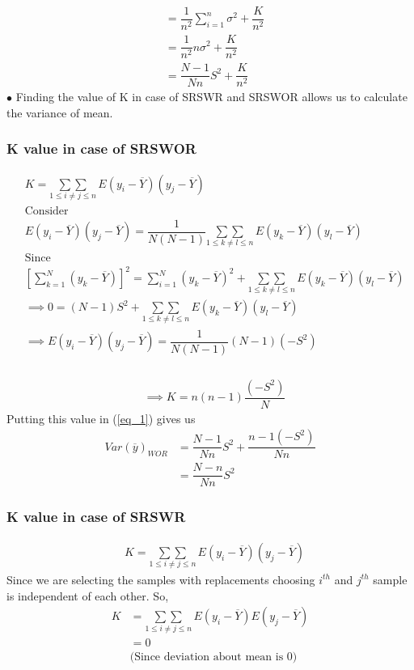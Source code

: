 \documentclass{beamer}
\begin{document}
\begin{frame}
\frametitle{}
\begin{align}
& = \dfrac{1}{n^2}\sum_{i=1}^{n} \sigma^2 + \dfrac{K}{n^2}\\
& = \dfrac{1}{n^2} n \sigma^2 +\dfrac{K}{n^2} \\
&= \dfrac{N-1}{Nn} S^2+\dfrac{K}{n^2}\label{eq_1}
\end{align}
$\bullet$ Finding the value of K in case of SRSWR and SRSWOR allows us to calculate the variance of mean.
\end{frame}

\begin{frame}
\frametitle{K value in case of SRSWOR}
\begin{align*}
&K=\underset{1\leq i\neq j\leq n}{\sum\sum}\, E(y_i-\overline{Y})(y_j-\overline{Y})\\
&\text{Consider}\\
&E(y_i-\overline{Y})(y_j-\overline{Y})=\dfrac{1}{N(N-1)}\underset{1\leq k\neq l\leq n}{\sum\sum}\, E(y_k-\overline{Y})(y_l-\overline{Y})\\
&\text{Since}\\
&\left[\sum_{k=1}^N(y_k-\overline{Y})\right]^2=\sum_{i=1}^{N}(y_k-\overline{Y})^2+
\underset{1\leq k\neq l\leq n}{\sum\sum}\, E(y_k-\overline{Y})(y_l-\overline{Y})\\
&\implies 0 = (N-1)S^2+\underset{1\leq k\neq l\leq n}{\sum\sum}\, E(y_k-\overline{Y})(y_l-\overline{Y})\\
& \implies E(y_i-\overline{Y})(y_j-\overline{Y})=\dfrac{1}{N(N-1)}(N-1)(-S^2)
\end{align*}
\end{frame}

\begin{frame}
\frametitle{}
\begin{align*}
& \implies K = n(n-1)\dfrac{(-S^2)}{N}
\end{align*}
Putting this value in (\ref{eq_1}) gives us 
\begin{align}
Var(\overline{y})_{WOR} & = \dfrac{N-1}{Nn} S^2+ \dfrac{n-1(-S^2)}{Nn}\\
& = \dfrac{N-n}{Nn} S^2 \label{eq_2}
\end{align}

\end{frame}

\begin{frame}
\frametitle{K value in case of SRSWR}
\begin{align*}
&K=\underset{1\leq i\neq j\leq n}{\sum\sum}\, E(y_i-\overline{Y})(y_j-\overline{Y})
\end{align*}
Since we are selecting the samples with replacements choosing $i^{th}$ and $j^{th}$ sample is independent of each other. So,
\begin{align*}
K&=\underset{1\leq i\neq j\leq n}{\sum\sum}\, E(y_i-\overline{Y})E(y_j-\overline{Y})\\
& = 0\\
& \text{(Since deviation about mean is 0)}
\end{align*}
\end{frame}
\end{document}
